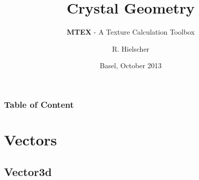 \documentclass[compress]{beamer}
\author{R. Hielscher}
\title{Crystal Geometry}
\subtitle{{\bf{\color{red}M}TEX} - A Texture Calculation Toolbox}
\institute{Faculty of Mathematics,\\
	Chemnitz University of Technology, Germany}
\date{Basel, October 2013}
\begin{document}
\begin{frame}
  \maketitle{}
\end{frame}


\begin{frame}
  \frametitle{Table of Content}

\tableofcontents{}

\end{frame}


\section{Vectors}

\subsection*{Vector3d}
\end{document}
